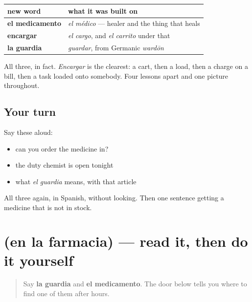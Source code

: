 \begin{grammarlens}[title={Grammar Lens: two of the three were relatives}]
\noindent
\begin{tabularx}{\linewidth}{@{}>{\raggedright\arraybackslash}X>{\raggedright\arraybackslash}X@{}}
\toprule
\textbf{new word} & \textbf{what it was built on} \\
\midrule
\textbf{el medicamento} & \emph{el médico} — healer and the thing that heals \\
\textbf{encargar} & \emph{el cargo}, and \emph{el carrito} under that \\
\textbf{la guardia} & \emph{guardar}, from Germanic \emph{wardōn} \\
\bottomrule
\end{tabularx}

All three, in fact. \emph{Encargar} is the clearest: a cart, then a load, then a charge on a bill, then a task loaded onto somebody. Four lessons apart and one picture throughout.
\end{grammarlens}

\subsection*{Your turn}
Say these aloud:

\begin{itemize}
\raggedright
  \item can you order the medicine in?
  \item the duty chemist is open tonight
  \item what \emph{el guardia} means, with that article
\end{itemize}

\begin{tcolorbox}[breakable,colback=teal!4,colframe=teal!35!black,title={Before you move on}]
All three again, in Spanish, without looking. Then one sentence getting a medicine that is not in stock.
\end{tcolorbox}
\section[Practice]{(en la farmacia) — read it, then do it yourself}

\label{lesson:ES-C457-sintesis-guardia}



\begin{quote}
Say \textbf{la guardia} and \textbf{el medicamento}. The door below tells you where to find one of them after hours.
\end{quote}

